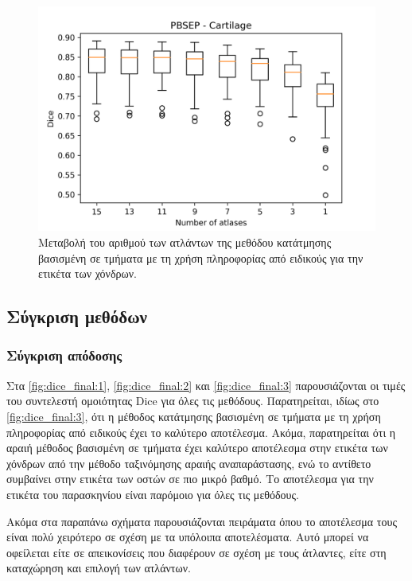 \documentclass[a4paper,12pt]{article}
\begin{document}
\begin{figure}[H]
    \centering
    \includegraphics[width=0.85\linewidth]{PBSEP_Number_of_atlases_Cartilage_plot.png}
    \caption{Μεταβολή του αριθμού των ατλάντων της μεθόδου κατάτμησης βασισμένη
             σε τμήματα με τη χρήση πληροφορίας από ειδικούς για την ετικέτα των
             χόνδρων.}
    \label{fig:PBSEP:atlases:3}
\end{figure}


\subsection{Σύγκριση μεθόδων}

\subsubsection{Σύγκριση απόδοσης}

Στα \autoref{fig:dice_final:1}, \autoref{fig:dice_final:2} και
\autoref{fig:dice_final:3} παρουσιάζονται οι τιμές του συντελεστή ομοιότητας
Dice για όλες τις μεθόδους. Παρατηρείται, ιδίως στο \autoref{fig:dice_final:3},
ότι η μέθοδος κατάτμησης βασισμένη σε τμήματα με τη χρήση πληροφορίας από
ειδικούς έχει το καλύτερο αποτέλεσμα. Ακόμα, παρατηρείται ότι η αραιή μέθοδος
βασισμένη σε τμήματα έχει καλύτερο αποτέλεσμα στην ετικέτα των χόνδρων από την
μέθοδο ταξινόμησης αραιής αναπαράστασης, ενώ το αντίθετο συμβαίνει στην ετικέτα
των οστών σε πιο μικρό βαθμό. Το αποτέλεσμα για την ετικέτα του παρασκηνίου
είναι παρόμοιο για όλες τις μεθόδους. 

Ακόμα στα παραπάνω σχήματα παρουσιάζονται πειράματα όπου το αποτέλεσμα τους
είναι πολύ χειρότερο σε σχέση με τα υπόλοιπα αποτελέσματα. Αυτό μπορεί να
οφείλεται είτε σε απεικονίσεις που διαφέρουν σε σχέση με τους άτλαντες, είτε στη
καταχώρηση και επιλογή των ατλάντων.
\end{document}
